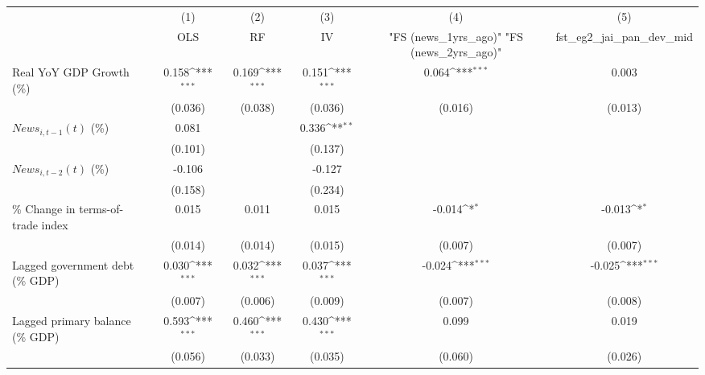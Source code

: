 {
\def\sym#1{\ifmmode^{#1}\else\(^{#1}\)\fi}
\begin{tabular}{l*{5}{c}}
\toprule
                    &\multicolumn{1}{c}{(1)}&\multicolumn{1}{c}{(2)}&\multicolumn{1}{c}{(3)}&\multicolumn{1}{c}{(4)}&\multicolumn{1}{c}{(5)}\\
                    &\multicolumn{1}{c}{OLS}&\multicolumn{1}{c}{RF}&\multicolumn{1}{c}{IV}&\multicolumn{1}{c}{ "FS (news_1yrs_ago)"  "FS (news_2yrs_ago)" }&\multicolumn{1}{c}{fst_eg2_jai_pan_dev_mid}\\
\midrule
Real YoY GDP Growth (\%)&       0.158\sym{***}&       0.169\sym{***}&       0.151\sym{***}&       0.064\sym{***}&       0.003         \\
                    &     (0.036)         &     (0.038)         &     (0.036)         &     (0.016)         &     (0.013)         \\
\addlinespace
$ News_{i,t-1}(t)$ (\%)&       0.081         &                     &       0.336\sym{**} &                     &                     \\
                    &     (0.101)         &                     &     (0.137)         &                     &                     \\
\addlinespace
$ News_{i,t-2}(t)$ (\%)&      -0.106         &                     &      -0.127         &                     &                     \\
                    &     (0.158)         &                     &     (0.234)         &                     &                     \\
\addlinespace
\% Change in terms-of-trade index&       0.015         &       0.011         &       0.015         &      -0.014\sym{*}  &      -0.013\sym{*}  \\
                    &     (0.014)         &     (0.014)         &     (0.015)         &     (0.007)         &     (0.007)         \\
\addlinespace
Lagged government debt (\% GDP)&       0.030\sym{***}&       0.032\sym{***}&       0.037\sym{***}&      -0.024\sym{***}&      -0.025\sym{***}\\
                    &     (0.007)         &     (0.006)         &     (0.009)         &     (0.007)         &     (0.008)         \\
\addlinespace
Lagged primary balance (\% GDP)&       0.593\sym{***}&       0.460\sym{***}&       0.430\sym{***}&       0.099         &       0.019         \\
                    &     (0.056)         &     (0.033)         &     (0.035)         &     (0.060)         &     (0.026)         \\

\end{tabular}}
